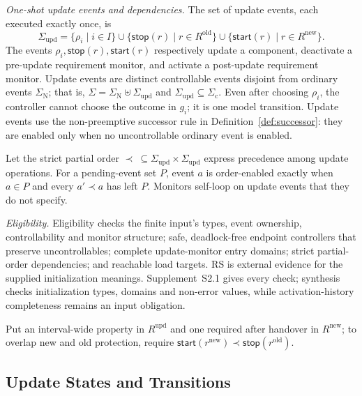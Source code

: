 \documentclass[acmsmall,screen,review,anonymous]{acmart}
\newcommand{\Sigmac}{\Sigma_{\mathrm{c}}}
\newcommand{\SigmaN}{\Sigma_{\mathrm{N}}}
\newcommand{\SigmaU}{\Sigma_{\mathrm{upd}}}
\newcommand{\ustart}[1]{\mathsf{start}(#1)}
\newcommand{\ustop}[1]{\mathsf{stop}(#1)}
\begin{document}
\begin{definition}
\par\noindent\emph{One-shot update events and dependencies.}
The set of update events, each executed exactly once, is
  \[
  \SigmaU=
    \{\rho_i\mid i\in I\}
    \cup\{\ustop{r}\mid r\in R^{\mathrm{old}}\}
    \cup\{\ustart{r}\mid r\in R^{\mathrm{new}}\}.
  \tag{1}
  \]
The events $\rho_i,\ustop{r},\ustart{r}$ respectively update a component, deactivate a pre-update requirement monitor, and activate a post-update requirement monitor. Update events are distinct controllable events disjoint from ordinary events $\SigmaN$; that is,
$\Sigma=\SigmaN\uplus\SigmaU$ and $\SigmaU\subseteq\Sigmac$. Even after choosing $\rho_i$, the controller cannot choose the outcome in $g_i$; it is one model transition.
Update events use the non-preemptive successor rule in Definition~\ref{def:successor}: they are enabled only when no uncontrollable ordinary event is enabled.

Let the strict partial order $\prec\ \subseteq\SigmaU\times\SigmaU$ express precedence among update operations. For a pending-event set $P$, event $a$ is order-enabled exactly when $a\in P$ and every $a'\prec a$ has left $P$.
Monitors self-loop on update events that they do not specify.
\par\noindent\emph{Eligibility.}
Eligibility checks the finite input's types, event ownership, controllability and monitor structure; safe, deadlock-free endpoint controllers that preserve uncontrollables; complete update-monitor entry domains; strict partial-order dependencies; and reachable load targets. RS is external evidence for the supplied initialization meanings. Supplement~S2.1 gives every check; synthesis checks initialization types, domains and non-error values, while activation-history completeness remains an input obligation.
\end{definition}

Put an interval-wide property in $R^{\mathrm{upd}}$ and one required after handover in $R^{\mathrm{new}}$; to overlap new and old protection, require $\ustart{r^{\mathrm{new}}}\prec\ustop{r^{\mathrm{old}}}$.

\subsection{Update States and Transitions}
\end{document}
